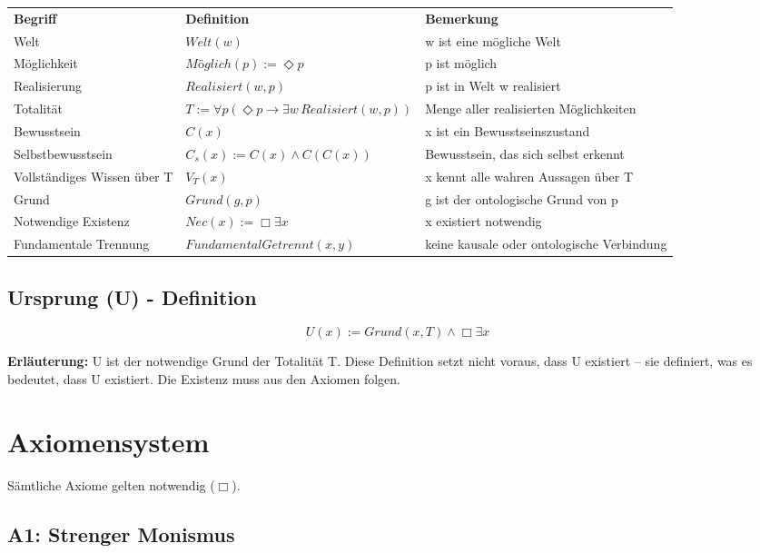\documentclass[
]{article}
\begin{document}
\begin{tabular}{lll}
\textbf{Begriff} & \textbf{Definition} & \textbf{Bemerkung} \\
Welt & \(Welt(w)\) & w ist eine mögliche Welt \\
Möglichkeit & \(Möglich(p) := \Diamond p\) & p ist möglich \\
Realisierung & \(Realisiert(w,p)\) & p ist in Welt w realisiert \\
Totalität & \(T := \forall p(\Diamond p \rightarrow \exists w\, Realisiert(w,p))\) & Menge aller realisierten Möglichkeiten \\
Bewusstsein & \(C(x)\) & x ist ein Bewusstseinszustand \\
Selbstbewusstsein & \(C_s(x) := C(x) \land C(C(x))\) & Bewusstsein, das sich selbst erkennt \\
Vollständiges Wissen über T & \(V_T(x)\) & x kennt alle wahren Aussagen über T \\
Grund & \(Grund(g,p)\) & g ist der ontologische Grund von p \\
Notwendige Existenz & \(Nec(x) := \Box \exists x\) & x existiert notwendig \\
Fundamentale Trennung & \(FundamentalGetrennt(x,y)\) & keine kausale oder ontologische Verbindung \\
\end{tabular}

\subsection{Ursprung (U) - Definition}\label{ursprung-u-definition}

\[
\boxed{U(x) := Grund(x, T) \land \Box \exists x}
\]

\textbf{Erläuterung:} U ist der notwendige Grund der Totalität T. Diese Definition setzt nicht voraus, dass U existiert -- sie definiert, was es bedeutet, dass U existiert. Die Existenz muss aus den Axiomen folgen.

\section{Axiomensystem}\label{axiomensystem}

Sämtliche Axiome gelten notwendig (\(\Box\)).

\subsection{A1: Strenger Monismus}\label{a1-strenger-monismus}
\end{document}
